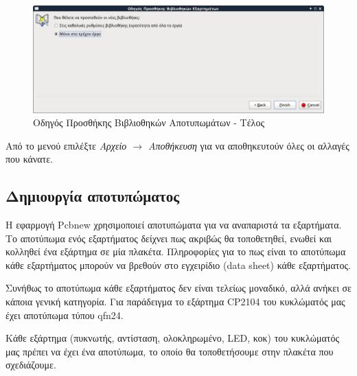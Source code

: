 \documentclass[a4paper]{article}
\begin{document}
\begin{figure}
  \begin{center}
    \includegraphics[width=.9\textwidth]{img/pcb-dial-libwiz3.png}
    \caption{Οδηγός Προσθήκης Βιβλιοθηκών Αποτυπωμάτων - Τέλος}
    \label{fig:pcb-dial-libwiz3}
  \end{center}
\end{figure}


Από το μενού επιλέξτε \textit{Αρχείο $\rightarrow$ Αποθήκευση} για να αποθηκευτούν όλες οι αλλαγές που κάνατε.


\subsection{Δημιουργία αποτυπώματος}
Η εφαρμογή Pcbnew χρησιμοποιεί αποτυπώματα για να αναπαριστά τα εξαρτήματα. Το αποτύπωμα ενός εξαρτήματος δείχνει πως ακριβώς θα τοποθετηθεί, ενωθεί και κολληθεί ένα εξάρτημα σε μία πλακέτα. Πληροφορίες για το πως είναι το αποτύπωμα κάθε εξαρτήματος μπορούν να βρεθούν στο εγχειρίδιο (data sheet) κάθε εξαρτήματος. 

Συνήθως το αποτύπωμα κάθε εξαρτήματος δεν είναι τελείως μοναδικό, αλλά ανήκει σε κάποια γενική κατηγορία. Για παράδειγμα το εξάρτημα CP2104 του κυκλώματός μας έχει αποτύπωμα τύπου qfn24.

Κάθε εξάρτημα (πυκνωτής, αντίσταση, ολοκληρωμένο, LED, κοκ) του κυκλώματός μας πρέπει να έχει ένα αποτύπωμα, το οποίο θα τοποθετήσουμε στην πλακέτα που σχεδιάζουμε.
\end{document}
